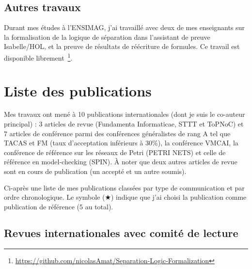 \vspace{10pt}
\subsection{Autres travaux}
\vspace{10pt}

Durant mes études à l'ENSIMAG, j'ai travaillé avec deux de mes enseignants sur
la formalisation de la logique de séparation dans l'assistant de preuve
Isabelle/HOL, et la preuve de résultats de réécriture de formules. Ce travail
est disponible
librement~\footnote{\url{https://github.com/nicolasAmat/Separation-Logic-Formalization}}.

\vspace{10pt}
\section{Liste des publications}
\label{sec:publications}
\vspace{10pt}

Mes travaux ont mené à 10 publications internationales (dont je suis le
co-auteur principal) : 3 articles de revue (Fundamenta Informaticae, STTT et
ToPNoC) et 7 articles de conférence parmi des conférences généralistes de rang A
tel que TACAS et FM (taux d'acceptation inférieurs à 30\%), la conférence VMCAI,
la conférence de référence sur les réseaux de Petri (PETRI NETS) et celle de
référence en model-checking (SPIN). À noter que deux autres articles de revue
sont en cours de publication (un accepté et un autre soumis).
\medbreak

Ci-après une liste de mes publications classées par type de communication et
par ordre chronologique. Le symbole ($\bigstar$) indique que j'ai choisi la
publication comme publication de référence (5 au total).

\vspace{10pt}
\subsection{Revues internationales avec comité de lecture}
\vspace{10pt}

